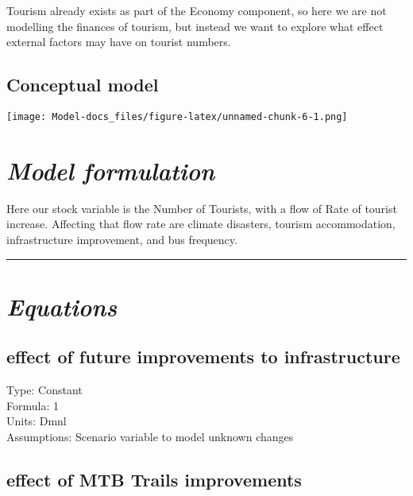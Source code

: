 \documentclass[
  11pt,
]{book}
\begin{document}
Tourism already exists as part of the Economy component, so here we are not modelling the finances of tourism, but instead we want to explore what effect external factors may have on tourist numbers.

\hypertarget{conceptual-model-4}{%
\subsection{Conceptual model}\label{conceptual-model-4}}

\texttt{[image: Model-docs\_files/figure-latex/unnamed-chunk-6-1.png]}

\hypertarget{model-formulation-2}{%
\section{\texorpdfstring{\emph{Model formulation}}{Model formulation}}\label{model-formulation-2}}

Here our stock variable is the Number of Tourists, with a flow of Rate of tourist increase. Affecting that flow rate are climate disasters, tourism accommodation, infrastructure improvement, and bus frequency.

\begin{center}\rule{0.5\linewidth}{0.5pt}\end{center}

\hypertarget{equations-4}{%
\section{\texorpdfstring{\emph{Equations}}{Equations}}\label{equations-4}}

\hypertarget{effect-of-future-improvements-to-infrastructure}{%
\subsection{effect of future improvements to infrastructure}\label{effect-of-future-improvements-to-infrastructure}}

Type: Constant\\
Formula: 1\\
Units: Dmnl\\
Assumptions: Scenario variable to model unknown changes

\hypertarget{effect-of-mtb-trails-improvements}{%
\subsection{effect of MTB Trails improvements}\label{effect-of-mtb-trails-improvements}}
\end{document}
